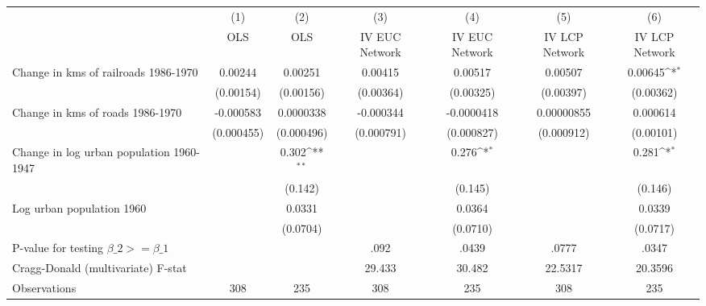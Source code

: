 {
\def\sym#1{\ifmmode^{#1}\else\(^{#1}\)\fi}
\begin{tabular}{l*{6}{c}}
\hline\hline
                &\multicolumn{1}{c}{(1)}&\multicolumn{1}{c}{(2)}&\multicolumn{1}{c}{(3)}&\multicolumn{1}{c}{(4)}&\multicolumn{1}{c}{(5)}&\multicolumn{1}{c}{(6)}\\
                &\multicolumn{1}{c}{OLS}&\multicolumn{1}{c}{OLS}&\multicolumn{1}{c}{IV EUC Network}&\multicolumn{1}{c}{IV EUC Network}&\multicolumn{1}{c}{IV LCP Network}&\multicolumn{1}{c}{IV LCP Network}\\
\hline
Change in kms of railroads 1986-1970&  0.00244         &  0.00251         &  0.00415         &  0.00517         &  0.00507         &  0.00645\sym{*}  \\
                &(0.00154)         &(0.00156)         &(0.00364)         &(0.00325)         &(0.00397)         &(0.00362)         \\
[1em]
Change in kms of roads 1986-1970&-0.000583         &0.0000338         &-0.000344         &-0.0000418         &0.00000855         & 0.000614         \\
                &(0.000455)         &(0.000496)         &(0.000791)         &(0.000827)         &(0.000912)         &(0.00101)         \\
[1em]
Change in log urban population 1960-1947&                  &    0.302\sym{**} &                  &    0.276\sym{*}  &                  &    0.281\sym{*}  \\
                &                  &  (0.142)         &                  &  (0.145)         &                  &  (0.146)         \\
[1em]
Log urban population 1960&                  &   0.0331         &                  &   0.0364         &                  &   0.0339         \\
                &                  & (0.0704)         &                  & (0.0710)         &                  & (0.0717)         \\
\hline
P-value for testing $\beta\_{2} >= \beta\_{1}$&                  &                  &     .092         &    .0439         &    .0777         &    .0347         \\
Cragg-Donald (multivariate) F-stat&                  &                  &   29.433         &   30.482         &  22.5317         &  20.3596         \\
Observations    &      308         &      235         &      308         &      235         &      308         &      235         \\
\hline\hline
\end{tabular}
}
